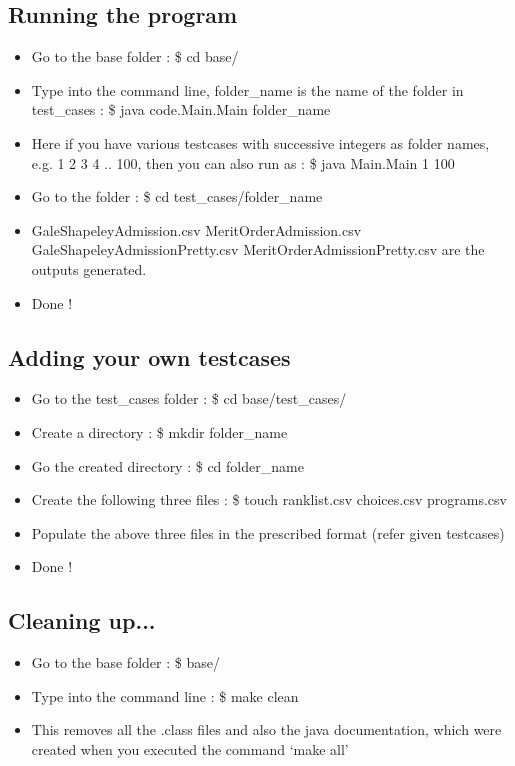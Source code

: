\documentclass[]{report}
\begin{document}
\subsection{Running the program}
\begin{itemize}
\item Go to the base folder : \$ cd base/
\item Type into the command line, folder\_name is the name of the folder in test\_cases : \$ java code.Main.Main folder\_name
\item Here if you have various testcases with successive integers as folder names, e.g. 1 2 3 4 .. 100, then you can also run as :  \$ java Main.Main 1 100
\item Go to the folder : \$ cd test\_cases/folder\_name
\item GaleShapeleyAdmission.csv MeritOrderAdmission.csv GaleShapeleyAdmissionPretty.csv MeritOrderAdmissionPretty.csv are the outputs generated.
\item Done !
\end{itemize}

\subsection{Adding your own testcases}
\begin{itemize}
\item Go to the test\_cases folder : \$ cd base/test\_cases/
\item Create a directory : \$ mkdir folder\_name
\item Go the created directory : \$ cd folder\_name
\item Create the following three files : \$ touch ranklist.csv choices.csv programs.csv
\item Populate the above three files in the prescribed format (refer given testcases)
\item Done ! 
\end{itemize}

\subsection{Cleaning up...}
\begin{itemize}
\item Go to the base folder : \$ base/
\item Type into the command line : \$ make clean
\item This removes all the .class files and also the java documentation, which were created when you executed the command `make all'
\end{itemize}
\end{document}
